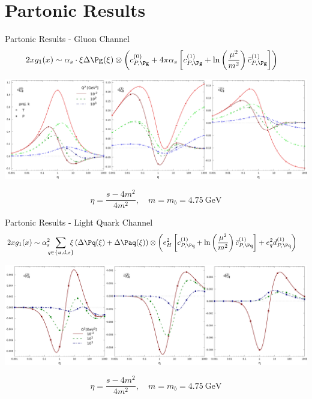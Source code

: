 \section{Partonic Results}
\begin{frame}{Partonic Results - Gluon Channel}
\begin{align*}
2xg_1(x) &\sim \alpha_s\cdot\xi\Delta \Pg(\xi) \otimes \left(c_{P,\Pg}^{(0)} + 4\pi\alpha_s\left[c_{P,\Pg}^{(1)} + \ln\left(\frac{\mu^2}{m^2}\right)\bar c_{P,\Pg}^{(1)}\right]\right)
\end{align*}
\begin{center}
\includegraphics[width=\textwidth]{img/cgTP}
\end{center}
\[\eta = \frac{s-4m^2}{4m^2},\quad m=m_b=\SI{4.75}{\GeV}\]
\end{frame}

\begin{frame}{Partonic Results - Light Quark Channel}
\begin{align*}
2xg_1(x) &\sim \alpha_s^2\!\!\!\sum_{q\in\{u,d,s\}}\!\!\!\!\xi\left(\Delta \Pq(\xi)+\Delta \Paq(\xi)\right) \otimes \left(e_H^2\left[c_{P,\Pq}^{(1)} + \ln\left(\frac{\mu^2}{m^2}\right)\bar c_{P,\Pq}^{(1)}\right] + e_q^2 d_{P,\Pq}^{(1)}\right)
\end{align*}
\begin{center}
\includegraphics[width=\textwidth]{img/cdqP}
\end{center}
\[\eta = \frac{s-4m^2}{4m^2},\quad m=m_b=\SI{4.75}{\GeV}\]
\end{frame}
